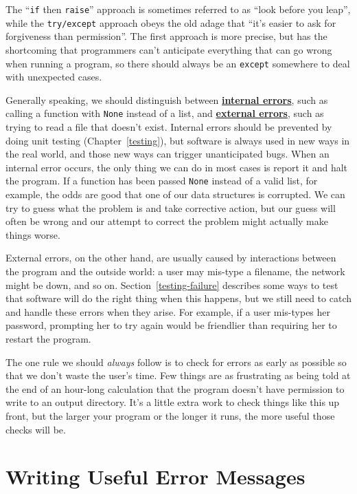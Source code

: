 \documentclass[
]{krantz}
\newcommand{\gref}[2]{\hyperlink{#2}{\textbf{#1}}}
\begin{document}
The ``\texttt{if} then \texttt{raise}'' approach is sometimes referred to as ``look before you leap'',
while the \texttt{try/except} approach obeys the old adage that
``it's easier to ask for forgiveness than permission''.
The first approach is more precise,
but has the shortcoming that programmers can't anticipate everything that can go wrong when running a program,
so there should always be an \texttt{except} somewhere
to deal with unexpected cases.

Generally speaking,
we should distinguish between \gref{internal errors}{internal\_error},
such as calling a function with \texttt{None} instead of a list,
and \gref{external errors}{external\_error},
such as trying to read a file that doesn't exist.
Internal errors should be prevented by doing unit testing (Chapter~\ref{testing}),
but software is always used in new ways in the real world,
and those new ways can trigger unanticipated bugs.
When an internal error occurs,
the only thing we can do in most cases is report it and halt the program.
If a function has been passed \texttt{None} instead of a valid list,
for example,
the odds are good that one of our data structures is corrupted.
We can try to guess what the problem is and take corrective action,
but our guess will often be wrong
and our attempt to correct the problem might actually make things worse.

External errors,
on the other hand,
are usually caused by interactions between the program and the outside world:
a user may mis-type a filename,
the network might be down,
and so on.
Section~\ref{testing-failure} describes some ways to test that
software will do the right thing when this happens,
but we still need to catch and handle these errors when they arise.
For example,
if a user mis-types her password,
prompting her to try again would be friendlier than
requiring her to restart the program.

The one rule we should \emph{always} follow is to check for errors as early as possible
so that we don't waste the user's time.
Few things are as frustrating as being told at the end of an hour-long calculation
that the program doesn't have permission to write to an output directory.
It's a little extra work to check things like this up front,
but the larger your program or the longer it runs,
the more useful those checks will be.

\hypertarget{errors-messages}{%
\section{Writing Useful Error Messages}\label{errors-messages}}
\end{document}

